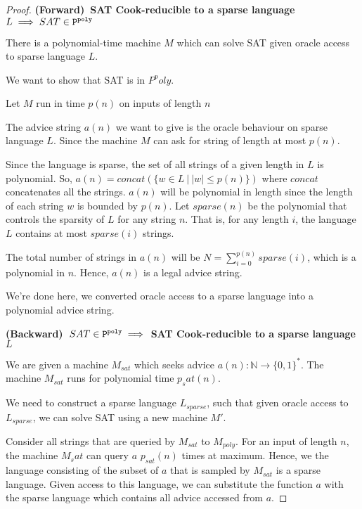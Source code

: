 \begin{proof}
\textbf{(Forward)~SAT Cook-reducible to a sparse language $L \implies SAT \in \text{$\texttt{P}^{\texttt{poly}}$}$}

There is a polynomial-time machine $M$ which can solve SAT given oracle
access to sparse language $L$.

We want to show that SAT is in $P^poly$.

Let $M$ run in time $p(n)$ on inputs of length $n$

The advice string $a(n)$ we want to give is the oracle behaviour on sparse language $L$.
Since the machine $M$ can ask for string of length at most $p(n)$.

Since the language is sparse, the set of all strings of a given length in $L$ is polynomial.
So, $a(n) = concat(\{ w \in L~\vert~|w| \leq p(n) \})$ where $concat$ concatenates
all the strings.
$a(n)$ will be polynomial in length since the length of each string $w$ is bounded by $p(n)$.
Let $sparse(n)$ be the polynomial that controls the sparsity of $L$ for any string $n$.
That is, for any length $i$, the language $L$ contains at most $sparse(i)$ strings.

The total number of strings in $a(n)$ will be $N = \sum_{i=0}^{p(n)} sparse(i)$, which
is a polynomial in $n$. Hence, $a(n)$ is a legal advice string.

We're done here, we converted oracle access to a sparse language into a 
polynomial advice string.

\textbf{(Backward)~$SAT \in \text{$\texttt{P}^{\texttt{poly}}$} \implies$ SAT Cook-reducible to a sparse language $L$}

We are given a machine $M_{sat}$ which seeks advice $a(n): \mathbb{N} \to \{0, 1\}^*$.
The machine $M_{sat}$ runs for polynomial time $p_sat(n)$.

We need to construct a sparse language $L_{sparse}$, such that given oracle access
to $L_{sparse}$, we can solve SAT using a new machine $M'$.

Consider all strings that are queried by $M_{sat}$ to $M_{poly}$. 
For an input of length $n$, the machine $M_sat$ can query $a$ 
$p_{sat}(n)$ times at maximum. Hence, we the language consisting of the subset 
of $a$ that is sampled by $M_{sat}$ is a sparse language. 
Given access to this language, we can substitute the
function $a$ with the sparse language which contains all advice accessed from $a$.



\end{proof}



